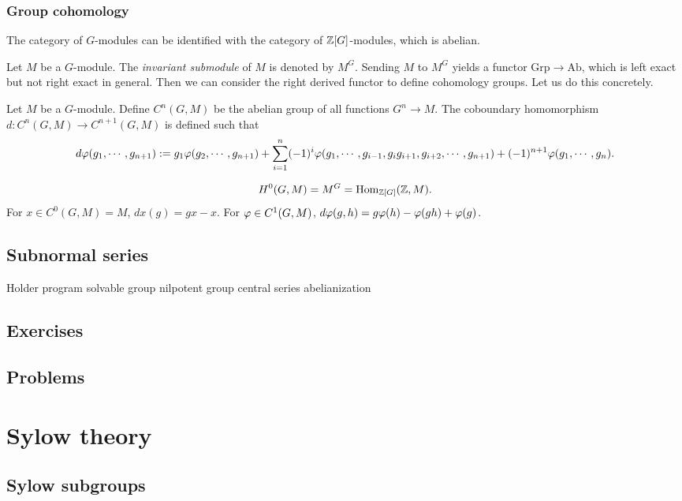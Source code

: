 \documentclass{../../large}
\begin{document}
\subsection*{Group cohomology}

The category of $G$-modules can be identified with the category of $\mathbb{Z}[G]$-modules, which is abelian.


Let $M$ be a $G$-module.
The \emph{invariant submodule} of $M$ is denoted by $M^G$.
Sending $M$ to $M^G$ yields a functor $\mathrm{Grp}\to\mathrm{Ab}$, which is left exact but not right exact in general.
Then we can consider the right derived functor to define cohomology groups.
Let us do this concretely.


Let $M$ be a $G$-module.
Define $C^n(G,M)$ be the abelian group of all functions $G^n\to M$.
The coboundary homomorphism $d:C^n(G,M)\to C^{n+1}(G,M)$ is defined such that
\[d\varphi(g_1,\cdots,g_{n+1}):=g_1\varphi(g_2,\cdots,g_{n+1})+\sum_{i=1}^n(-1)^i\varphi(g_1,\cdots,g_{i-1},g_ig_{i+1},g_{i+2},\cdots,g_{n+1})+(-1)^{n+1}\varphi(g_1,\cdots,g_n).\]

\[H^0(G,M)=M^G=\operatorname{Hom}_{\mathbb{Z}[G]}(\mathbb{Z},M).\]
For $x\in C^0(G,M)=M$, $dx(g)=gx-x$.
For $\varphi\in C^1(G,M)$, $d\varphi(g,h)=g\varphi(h)-\varphi(gh)+\varphi(g)$.


\section{Subnormal series}

Holder program
solvable group
nilpotent group
central series
abelianization

\section*{Exercises}
\begin{prb}
\end{prb}

\section*{Problems}







\chapter{Sylow theory}

\section{Sylow subgroups}
\end{document}

